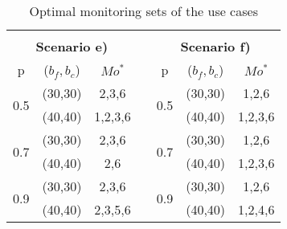 \begin{table}[h]
{\begin{tabular}{ccccccc}
                                           &                                  &                              &                       &                                           &                                  &                              \\
\multicolumn{3}{c}{\textbf{Scenario e)}}                                                                     &                       & \multicolumn{3}{c}{\textbf{Scenario f)}}                                                                    \\ \cline{1-3} \cline{5-7} 
\multicolumn{1}{|c|}{p}                    & \multicolumn{1}{c|}{($b_f,b_c$)} & \multicolumn{1}{c|}{$Mo^*$}  & \multicolumn{1}{c|}{} & \multicolumn{1}{c|}{p}                    & \multicolumn{1}{c|}{($b_f,b_c$)} & \multicolumn{1}{c|}{$Mo^*$}  \\ \cline{1-3} \cline{5-7} 
\multicolumn{1}{|c|}{\multirow{2}{*}{0.5}} & \multicolumn{1}{c|}{(30,30)}     & \multicolumn{1}{c|}{2,3,6}   & \multicolumn{1}{c|}{} & \multicolumn{1}{c|}{\multirow{2}{*}{0.5}} & \multicolumn{1}{c|}{(30,30)}     & \multicolumn{1}{c|}{1,2,6}   \\ \cline{2-3} \cline{6-7} 
\multicolumn{1}{|c|}{}                     & \multicolumn{1}{c|}{(40,40)}     & \multicolumn{1}{c|}{1,2,3,6} & \multicolumn{1}{c|}{} & \multicolumn{1}{c|}{}                     & \multicolumn{1}{c|}{(40,40)}     & \multicolumn{1}{c|}{1,2,3,6} \\ \cline{1-3} \cline{5-7} 
\multicolumn{1}{|c|}{\multirow{2}{*}{0.7}} & \multicolumn{1}{c|}{(30,30)}     & \multicolumn{1}{c|}{2,3,6}   & \multicolumn{1}{c|}{} & \multicolumn{1}{c|}{\multirow{2}{*}{0.7}} & \multicolumn{1}{c|}{(30,30)}     & \multicolumn{1}{c|}{1,2,6}   \\ \cline{2-3} \cline{6-7} 
\multicolumn{1}{|c|}{}                     & \multicolumn{1}{c|}{(40,40)}     & \multicolumn{1}{c|}{2,6}     & \multicolumn{1}{c|}{} & \multicolumn{1}{c|}{}                     & \multicolumn{1}{c|}{(40,40)}     & \multicolumn{1}{c|}{1,2,3,6} \\ \cline{1-3} \cline{5-7} 
\multicolumn{1}{|c|}{\multirow{2}{*}{0.9}} & \multicolumn{1}{c|}{(30,30)}     & \multicolumn{1}{c|}{2,3,6}   & \multicolumn{1}{c|}{} & \multicolumn{1}{c|}{\multirow{2}{*}{0.9}} & \multicolumn{1}{c|}{(30,30)}     & \multicolumn{1}{c|}{1,2,6}   \\ \cline{2-3} \cline{6-7} 
\multicolumn{1}{|c|}{}                     & \multicolumn{1}{c|}{(40,40)}     & \multicolumn{1}{c|}{2,3,5,6} & \multicolumn{1}{c|}{} & \multicolumn{1}{c|}{}                     & \multicolumn{1}{c|}{(40,40)}     & \multicolumn{1}{c|}{1,2,4,6} \\ \cline{1-3} \cline{5-7} 
\end{tabular}%
}
\caption{Optimal monitoring sets of the use cases}
\label{tab:mdp-usecase-optiset}
\end{table}